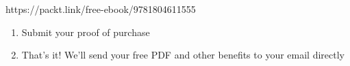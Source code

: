 
https://packt.link/free-ebook/9781804611555

\begin{enumerate}
\item
  Submit your proof of purchase
\item
  That's it! We'll send your free PDF and other benefits to your email directly
\end{enumerate}
